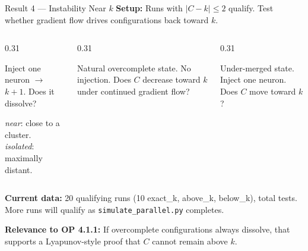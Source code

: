 \documentclass[aspectratio=169, 10pt]{beamer}
\begin{document}
\begin{frame}{Result 4 — Instability Near $k$}
  \vspace{-0.1em}
  \textbf{Setup:} Runs with $|C - k| \leq 2$ qualify.
  Test whether gradient flow drives configurations back toward $k$.

  \vspace{0.4em}
  \begin{columns}[T]
    \begin{column}{0.31\textwidth}
      \begin{tcolorbox}[slideboxA, title={exact\_k \; ($C = k$)}]
        \small
        Inject one neuron $\to$ $k{+}1$.
        Does it dissolve?

        \vspace{3pt}
        \textit{near}: close to a cluster.\\
        \textit{isolated}: maximally distant.
      \end{tcolorbox}
    \end{column}
    \begin{column}{0.31\textwidth}
      \begin{tcolorbox}[slideboxB, title={above\_k \; ($k < C \leq k{+}2$)}]
        \small
        Natural overcomplete state.
        No injection.
        Does $C$ decrease toward $k$ under
        continued gradient flow?
      \end{tcolorbox}
    \end{column}
    \begin{column}{0.31\textwidth}
      \begin{tcolorbox}[slideboxC, title={below\_k \; ($k{-}2 \leq C < k$)}]
        \small
        Under-merged state.
        Inject one neuron.
        Does $C$ move toward $k$?
      \end{tcolorbox}
    \end{column}
  \end{columns}

  \vspace{0.5em}
  \small
  \textbf{Current data:} 20 qualifying runs
  (10 exact\_k, above\_k, below\_k), total tests.
  More runs will qualify as \texttt{simulate\_parallel.py} completes.

  \vspace{0.3em}
  \textbf{Relevance to OP 4.1.1:}
  If overcomplete configurations always dissolve,
  that supports a Lyapunov-style proof that $C$ cannot remain above $k$.
\end{frame}
\end{document}
